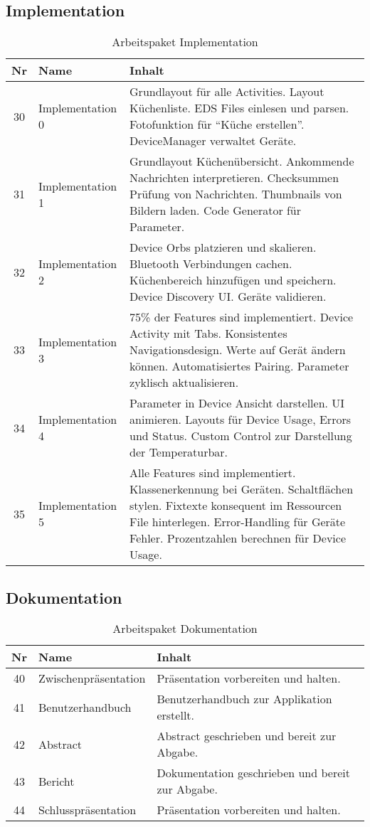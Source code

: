 \subsection{Implementation}
\begin{table}[H]
\begin{tabularx}{\textwidth}{ c | l | X }
\textbf{Nr} & \textbf{Name} & \textbf{Inhalt} \\ \hline
30 & Implementation 0 & Grundlayout für alle Activities. Layout Küchenliste. EDS Files einlesen und parsen. Fotofunktion für \enquote{Küche erstellen}. DeviceManager verwaltet Geräte.\\ \hline
31 & Implementation 1 & Grundlayout Küchenübersicht. Ankommende Nachrichten interpretieren. Checksummen Prüfung von Nachrichten. Thumbnails von Bildern laden. Code Generator für Parameter.\\ \hline
32 & Implementation 2 & Device Orbs platzieren und skalieren. Bluetooth Verbindungen cachen. Küchenbereich hinzufügen und speichern. Device Discovery UI. Geräte validieren.\\ \hline
33 & Implementation 3 & 75\% der Features sind implementiert. Device Activity mit Tabs. Konsistentes Navigationsdesign. Werte auf Gerät ändern können. Automatisiertes Pairing. Parameter zyklisch aktualisieren. \\ \hline
34 & Implementation 4 & Parameter in Device Ansicht darstellen. UI animieren. Layouts für Device Usage, Errors und Status. Custom Control zur Darstellung der Temperaturbar.\\ \hline
35 & Implementation 5 & Alle Features sind implementiert. Klassenerkennung bei Geräten. Schaltflächen stylen. Fixtexte konsequent im Ressourcen File hinterlegen. Error-Handling für Geräte Fehler. Prozentzahlen berechnen für Device Usage.\\
\end{tabularx}
\caption{Arbeitspaket Implementation}
\end{table}

\subsection{Dokumentation}
\begin{table}[H]
\begin{tabularx}{\textwidth}{ c | l | X }
\textbf{Nr} & \textbf{Name} & \textbf{Inhalt} \\ \hline
40 & Zwischenpräsentation & Präsentation vorbereiten und halten.\\ \hline
41 & Benutzerhandbuch & Benutzerhandbuch zur Applikation erstellt.\\ \hline
42 & Abstract & Abstract geschrieben und bereit zur Abgabe.\\ \hline
43 & Bericht & Dokumentation geschrieben und bereit zur Abgabe.\\ \hline
44 & Schlusspräsentation & Präsentation vorbereiten und halten.\\ 
\end{tabularx}
\caption{Arbeitspaket Dokumentation}
\end{table}